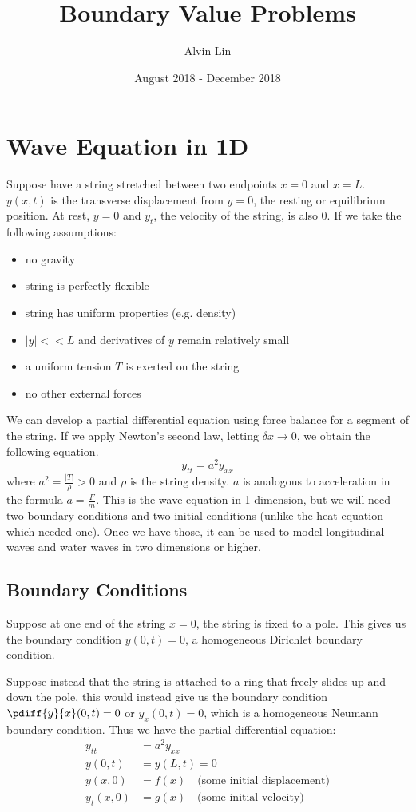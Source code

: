\documentclass{math}
\title{Boundary Value Problems}
\author{Alvin Lin}
\date{August 2018 - December 2018}
\begin{document}
\maketitle

\section*{Wave Equation in 1D}
Suppose have a string stretched between two endpoints \( x = 0 \) and
\( x = L \). \( y(x,t) \) is the transverse displacement from \( y = 0 \),
the resting or equilibrium position. At rest, \( y = 0 \) and \( y_t \), the
velocity of the string, is also 0. If we take the following assumptions:
\begin{itemize}
  \item no gravity
  \item string is perfectly flexible
  \item string has uniform properties (e.g. density)
  \item \( |y| << L \) and derivatives of \( y \) remain relatively small
  \item a uniform tension \( T \) is exerted on the string
  \item no other external forces
\end{itemize}
We can develop a partial differential equation using force balance for a
segment of the string. If we apply Newton's second law, letting \( \delta x\to0
\), we obtain the following equation.
\[ y_{tt} = a^2y_{xx} \]
where \( a^2 = \frac{|T|}{\rho} > 0 \) and \( \rho \) is the string density.
\( a \) is analogous to acceleration in the formula \( a = \frac{F}{m} \).
This is the wave equation in 1 dimension, but we will need two boundary
conditions and two initial conditions (unlike the heat equation which needed
one). Once we have those, it can be used to model longitudinal waves and water
waves in two dimensions or higher.

\subsection*{Boundary Conditions}
Suppose at one end of the string \( x = 0 \), the string is fixed to a pole.
This gives us the boundary condition \( y(0,t) = 0 \), a homogeneous Dirichlet
boundary condition. \par
Suppose instead that the string is attached to a ring that freely slides up and
down the pole, this would instead give us the boundary condition
\( \pdiff{y}{x}(0,t) = 0 \) or \( y_x(0,t) = 0 \), which is a homogeneous
Neumann boundary condition. Thus we have the partial differential equation:
\begin{align*}
  y_{tt} &= a^2y_{xx} \\
  y(0,t) &= y(L,t) = 0 \\
  y(x,0) &= f(x) \quad \text{(some initial displacement)} \\
  y_t(x,0) &= g(x) \quad \text{(some initial velocity)}
\end{align*}
\end{document}
